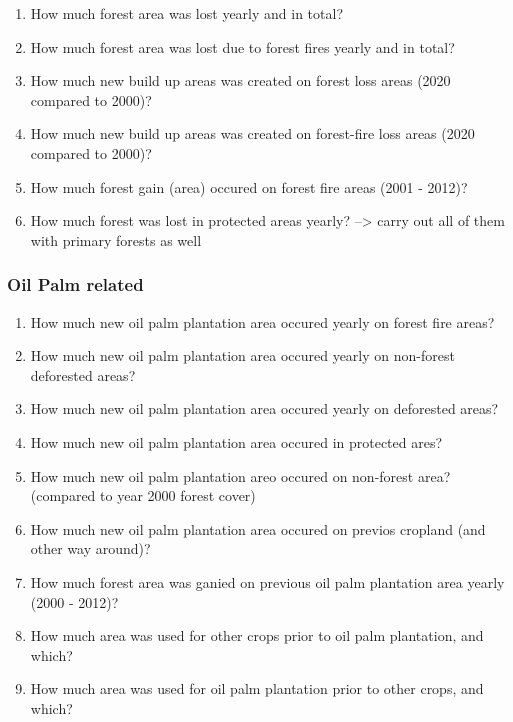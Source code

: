 \documentclass[
  letterpaper,
  DIV=11,
  numbers=noendperiod]{scrreprt}
\providecommand{\tightlist}{%
  \setlength{\itemsep}{0pt}\setlength{\parskip}{0pt}}\usepackage{longtable,booktabs,array}
\begin{document}
\begin{enumerate}
\def\labelenumi{\arabic{enumi}.}
\tightlist
\item
  How much forest area was lost yearly and in total?
\item
  How much forest area was lost due to forest fires yearly and in total?
\item
  How much new build up areas was created on forest loss areas (2020
  compared to 2000)?
\item
  How much new build up areas was created on forest-fire loss areas
  (2020 compared to 2000)?
\item
  How much forest gain (area) occured on forest fire areas (2001 -
  2012)?
\item
  How much forest was lost in protected areas yearly? --\textgreater{}
  carry out all of them with primary forests as well
\end{enumerate}

\hypertarget{oil-palm-related}{%
\subsubsection{Oil Palm related}\label{oil-palm-related}}

\begin{enumerate}
\def\labelenumi{\arabic{enumi}.}
\tightlist
\item
  How much new oil palm plantation area occured yearly on forest fire
  areas?
\item
  How much new oil palm plantation area occured yearly on non-forest
  deforested areas?
\item
  How much new oil palm plantation area occured yearly on deforested
  areas?
\item
  How much new oil palm plantation area occured in protected ares?
\item
  How much new oil palm plantation areo occured on non-forest area?
  (compared to year 2000 forest cover)
\item
  How much new oil palm plantation area occured on previos cropland (and
  other way around)?
\item
  How much forest area was ganied on previous oil palm plantation area
  yearly (2000 - 2012)?
\item
  How much area was used for other crops prior to oil palm plantation,
  and which?
\item
  How much area was used for oil palm plantation prior to other crops,
  and which?
\end{enumerate}
\end{document}

